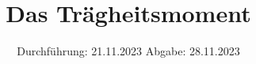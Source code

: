 

\subject{V101}
\title{Das Trägheitsmoment}
\date{%
  Durchführung: 21.11.2023
  \hspace{3em}
  Abgabe: 28.11.2023
}



\maketitle
\thispagestyle{empty}
\tableofcontents
\newpage






\printbibliography{}

